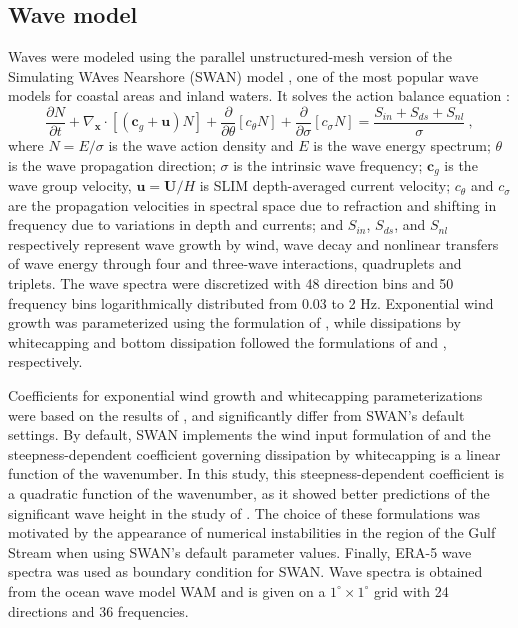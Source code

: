 \subsection{Wave model}
Waves were modeled using the parallel unstructured-mesh version of the Simulating WAves Nearshore (SWAN) model \citep{booij1999third}, one of the most popular wave models for coastal areas and inland waters. It solves the action balance equation \citep{mei1989applied}:
\begin{equation}
    \dfrac{\partial N}{\partial t} + \nabla_\mathbf{x}\cdot[(\mathbf{c}_g+\mathbf{u})N] + \dfrac{\partial }{\partial \theta}[c_\theta N] + \dfrac{\partial}{\partial \sigma}[c_\sigma N] = \dfrac{S_{in}+S_{ds}+S_{nl}}{\sigma}~, \label{eq:swan}
\end{equation}
where $N=E/\sigma$ is the wave action density and $E$ is the wave energy spectrum; $\theta$ is the wave propagation direction; $\sigma$ is the intrinsic wave frequency; $\mathbf{c}_g$ is the wave group velocity, $\mathbf{u}=\mathbf{U}/H$ is SLIM depth-averaged current velocity; $c_\theta$ and $c_\sigma$ are the propagation velocities in spectral space due to refraction and shifting in frequency due to variations in depth and currents; and $S_{in}$, $S_{ds}$, and $S_{nl}$ respectively represent wave growth by wind, wave decay and nonlinear transfers of wave energy through four and three-wave interactions, \ie quadruplets and triplets. The wave spectra were discretized with 48 direction bins and 50 frequency bins logarithmically distributed from 0.03 to 2 Hz. Exponential wind growth was parameterized using the formulation of \cite{janssen1991quasi}, while dissipations by whitecapping and bottom dissipation followed the formulations of \cite{komen1984existence} and \cite{madsen1989spectral}, respectively.

Coefficients for exponential wind growth and whitecapping parameterizations were based on the results of \cite{siadatmousavi2011evaluation}, and significantly differ from SWAN's default settings. By default, SWAN implements the wind input formulation of \cite{komen1984existence} and the steepness-dependent coefficient governing dissipation by whitecapping is a linear function of the wavenumber. In this study, this steepness-dependent coefficient is a quadratic function of the wavenumber, as it showed better predictions of the significant wave height in the study of \cite{siadatmousavi2011evaluation}. The choice of these formulations was motivated by the appearance of numerical instabilities in the region of the Gulf Stream when using SWAN's default parameter values. Finally, ERA-5 wave spectra was used as boundary condition for SWAN. Wave spectra is obtained from the ocean wave model WAM and is given on a $1^\circ \times 1^\circ$ grid with 24 directions and 36 frequencies.

